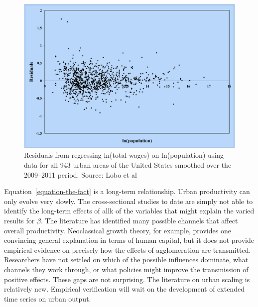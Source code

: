 \begin{figure}
    \centering
    \includegraphics[scale=0.25]{fig/Residuals-Lobo.png}
    \caption{Residuals from regressing ln(total wages) on ln(population) using data for all 943 urban areas of the United States smoothed over the 2009–2011 period. Source: Lobo et al \cite{loboUrbanScalingProduction2013}}
    \label{fig:Residuals-Lobo}
    
\end{figure}

Equation~\ref{equation-the-fact} is a long-term relationship. Urban productivity can only evolve very slowly. The cross-sectional studies to date are simply not able to identify the long-term effects of allk of the variables that might explain the varied results for  $\beta$. The literature has identified many possible channels that affect overall productivity. Neoclassical growth theory, for example, provides one convincing general explanation in terms of human capital, but it does not provide empirical evidence on precisely how the effects of agglomeration are transmitted. Researchers have not settled on which  of the possible influences dominate, what channels they work through, or what policies might improve the transmission of positive effects. These gaps are  not surprising. The literature on urban scaling is relatively new.  Empirical verification will wait on the development of extended time series on urban output.



